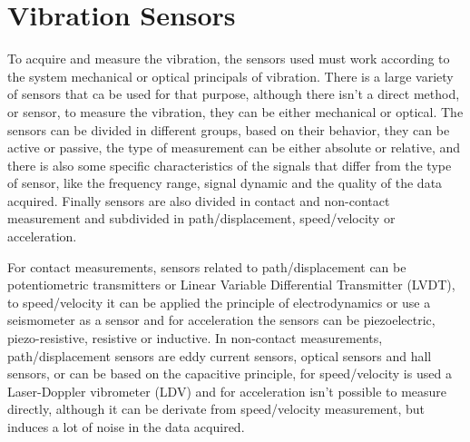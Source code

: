 \section{Vibration Sensors}\label{sec:VibSens}
To acquire and measure the vibration, the sensors used must work according to the system mechanical or optical principals of vibration. There is a large variety of sensors that ca be used for that purpose, although there isn't a direct method, or sensor, to measure the vibration, they can be either mechanical or optical. The sensors can be divided in different groups, based on their behavior, they can be active or passive, the type of measurement can be either absolute or relative, and there is also some specific characteristics of the signals that differ from the type of sensor, like the frequency range, signal dynamic and the quality of the data acquired. Finally sensors are also divided in contact and non-contact measurement and subdivided in path/displacement, speed/velocity or acceleration.

For contact measurements, sensors related to path/displacement can be potentiometric transmitters or Linear Variable Differential Transmitter (LVDT), to speed/velocity it can be applied the principle of electrodynamics or use a seismometer as a sensor and for acceleration the sensors can be piezoelectric, piezo-resistive, resistive or inductive. In non-contact measurements, path/displacement sensors are eddy current sensors, optical sensors and hall sensors, or can be based on the capacitive principle, for speed/velocity is used a Laser-Doppler vibrometer (LDV) and for acceleration isn't possible to measure directly, although it can be derivate from speed/velocity measurement, but induces a lot of noise in the data acquired\cite{SensorsVibrationMeasurement,VibrationMeasurementVibration2019}.

